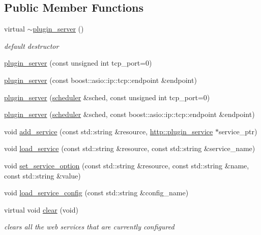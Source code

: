 \subsection*{Public Member Functions}
\begin{DoxyCompactItemize}
\item 
virtual \hyperlink{classpion_1_1http_1_1plugin__server_a1a13fd90941df5f55fe031fb3e7cd112}{$\sim$plugin\-\_\-server} ()
\begin{DoxyCompactList}\small\item\em default destructor \end{DoxyCompactList}\item 
\hyperlink{classpion_1_1http_1_1plugin__server_a1665134bc973811e4f56d9f9824a3d2e}{plugin\-\_\-server} (const unsigned int tcp\-\_\-port=0)
\item 
\hyperlink{classpion_1_1http_1_1plugin__server_abeb581d6ccb5b2a2e7758fdda5f823a1}{plugin\-\_\-server} (const boost\-::asio\-::ip\-::tcp\-::endpoint \&endpoint)
\item 
\hyperlink{classpion_1_1http_1_1plugin__server_aded4ff4815ca2b9823e0b1d2d41d5e36}{plugin\-\_\-server} (\hyperlink{classpion_1_1scheduler}{scheduler} \&sched, const unsigned int tcp\-\_\-port=0)
\item 
\hyperlink{classpion_1_1http_1_1plugin__server_a31afd25acb341046ed1bb02ae7097776}{plugin\-\_\-server} (\hyperlink{classpion_1_1scheduler}{scheduler} \&sched, const boost\-::asio\-::ip\-::tcp\-::endpoint \&endpoint)
\item 
void \hyperlink{classpion_1_1http_1_1plugin__server_a03cfde741f7ab4cfd55477c138b7e222}{add\-\_\-service} (const std\-::string \&resource, \hyperlink{classpion_1_1http_1_1plugin__service}{http\-::plugin\-\_\-service} $\ast$service\-\_\-ptr)
\item 
void \hyperlink{classpion_1_1http_1_1plugin__server_af528e5b824fe420f2193512a3ccb204f}{load\-\_\-service} (const std\-::string \&resource, const std\-::string \&service\-\_\-name)
\item 
void \hyperlink{classpion_1_1http_1_1plugin__server_abc695deb661af5e24953a1a43e9b56fd}{set\-\_\-service\-\_\-option} (const std\-::string \&resource, const std\-::string \&name, const std\-::string \&value)
\item 
void \hyperlink{classpion_1_1http_1_1plugin__server_a5da474d4ecbc39ef8ab6ab92e4b5e526}{load\-\_\-service\-\_\-config} (const std\-::string \&config\-\_\-name)
\item 
virtual void \hyperlink{classpion_1_1http_1_1plugin__server_a81c0779f8ddda5cdb6e05e1b74ec2fee}{clear} (void)
\begin{DoxyCompactList}\small\item\em clears all the web services that are currently configured \end{DoxyCompactList}\end{DoxyCompactItemize}
